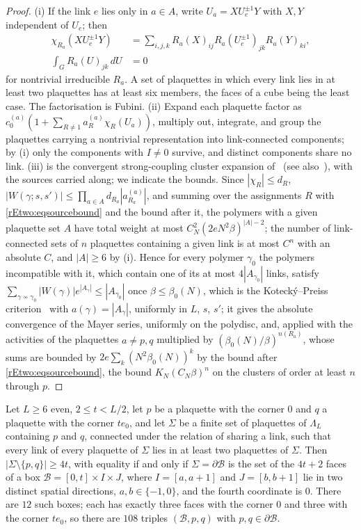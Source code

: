 \begin{proof}
(i) If the link $e$ lies only in $a\in A$, write $U_a=XU_e^{\pm1}Y$ with
$X,Y$ independent of $U_e$; then
\begin{align*}
\chi_{R_a}(XU_e^{\pm1}Y)&=\sum_{i,j,k}R_a(X)_{ij}R_a(U_e^{\pm1})_{jk}R_a(Y)_{ki},\\
\int_G R_a(U)_{jk}\,dU&=0
\end{align*}
for nontrivial irreducible $R_a$. A set of plaquettes in which every link lies in at
least two plaquettes has at least six members, the faces of a cube being
the least case. The factorisation is Fubini. (ii) Expand each plaquette
factor as $c^{(a)}_0(1+\sum_{R\ne1}a^{(a)}_R\chi_R(U_a))$, multiply out,
integrate, and group the plaquettes carrying a nontrivial representation
into link-connected components; by (i) only the components with
$I\ne0$ survive, and distinct components share no link. (iii) is the
convergent strong-coupling cluster expansion of~\cite{OSei78} (see
also~\cite[Ch.~3]{Sei82}), with the sources carried along; we indicate the
bounds. Since $|\chi_R|\le d_R$, $|W(\gamma;s,s')|\le\prod_{a\in A}d_{R_a}
|a^{(a)}_{R_a}|$, and summing over the assignments $R$ with
\eqref{rEtwo:eqsourcebound} and the bound after it, the polymers with a
given plaquette set $A$ have total weight at most $C_N^{2}(2eN^2\beta)^{|A|
-2}$; the number of link-connected sets of $n$ plaquettes containing a
given link is at most $C^n$ with an absolute $C$, and $|A|\ge6$ by (i).
Hence for every polymer $\gamma_0$ the polymers incompatible with it,
which contain one of its at most $4|A_{\gamma_0}|$ links, satisfy
$\sum_{\gamma\not\sim\gamma_0}|W(\gamma)|e^{|A_\gamma|}\le|A_{\gamma_0}|$
once $\beta\le\beta_0(N)$, which is the Koteck\'y--Preiss
criterion~\cite{KP86} with $a(\gamma)=|A_\gamma|$, uniformly in $L$, $s$,
$s'$; it gives the absolute convergence of the Mayer series, uniformly on
the polydisc, and, applied with the activities of the plaquettes $a\ne p,q$
multiplied by $(\beta_0(N)/\beta)^{n(R_a)}$, whose sums are bounded by $2e\sum_k(N^2\beta_0(N))^k$ by the bound after \eqref{rEtwo:eqsourcebound}, the bound
$K_N(C_N\beta)^n$ on the clusters of order at least $n$ through $p$.
\end{proof}

\begin{lemma}\label{rEtwo:plateau}
Let $L\ge6$ even, $2\le t<L/2$, let $p$ be a plaquette with the corner $0$
and $q$ a plaquette with the corner $te_0$, and let $\Sigma$ be a finite
set of plaquettes of $\Lambda_L$ containing $p$ and $q$, connected under
the relation of sharing a link, such that every link of every plaquette
of $\Sigma$ lies in at least two plaquettes of $\Sigma$. Then $|\Sigma
\setminus\{p,q\}|\ge4t$, with equality if and only if $\Sigma=\partial
\mathcal B$ is the set of the $4t+2$ faces of a box $\mathcal B=[0,t]
\times I\times J$, where $I=[a,a+1]$ and $J=[b,b+1]$ lie in two distinct
spatial directions, $a,b\in\{-1,0\}$, and the fourth coordinate is $0$.
There are $12$ such boxes; each has exactly three faces with the corner
$0$ and three with the corner $te_0$, so there are $108$ triples
$(\mathcal B,p,q)$ with $p,q\in\partial\mathcal B$.
\end{lemma}

